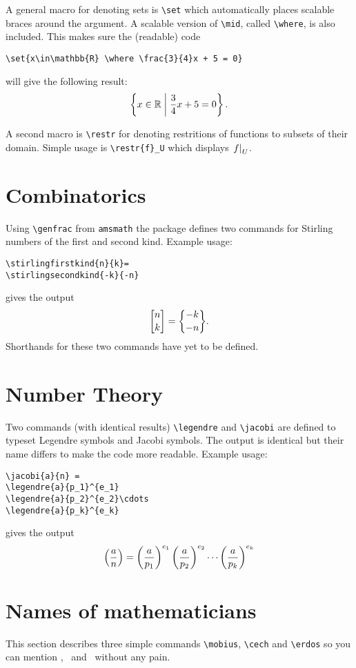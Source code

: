 \documentclass[12pt,a4paper]{article}
\begin{document}
A general macro for denoting sets is \verb|\set| which automatically places scalable braces around the argument.
A scalable version of \verb|\mid|, called \verb|\where|, is also included.
This makes sure the (readable) code
\begin{verbatim}
\set{x\in\mathbb{R} \where \frac{3}{4}x + 5 = 0}
\end{verbatim}
will give the following result:
\[\left\{x\in\mathbb{R} \mathrel{}\middle|\mathrel{} \frac{3}{4}x + 5 = 0\right\}.\]

A second macro is \verb|\restr| for denoting restritions of functions to subsets of their domain.
Simple usage is \verb|\restr{f}_U| which displays $\left.f\right|_U$.



\section{Combinatorics}

Using \verb|\genfrac| from \verb|amsmath| the package defines two commands for Stirling numbers of the first and second kind.
Example usage:
\begin{verbatim}
\stirlingfirstkind{n}{k}=
\stirlingsecondkind{-k}{-n}
\end{verbatim}
gives the output
\[
\stirlingfirstkind{n}{k}=
\stirlingsecondkind{-k}{-n}.
\]
Shorthands for these two commands have yet to be defined.

\section{Number Theory}
Two commands (with identical results) \verb|\legendre| and \verb|\jacobi| are defined to typeset Legendre symbols and Jacobi symbols.
The output is identical but their name differs to make the code more readable.
Example usage:
\begin{verbatim}
\jacobi{a}{n} =
\legendre{a}{p_1}^{e_1}
\legendre{a}{p_2}^{e_2}\cdots 
\legendre{a}{p_k}^{e_k}
\end{verbatim}
gives the output
\[
\left(\frac{a}{n}\right) =
\left(\frac{a}{p_1}\right)^{e_1}
\left(\frac{a}{p_2}\right)^{e_2}\cdots 
\left(\frac{a}{p_k}\right)^{e_k}
\]

\section{Names of mathematicians}
This section describes three simple commands \verb|\mobius|, \verb|\cech| and \verb|\erdos| so you can mention \mobius, \cech\ and \erdos\ without any pain.
\end{document}
